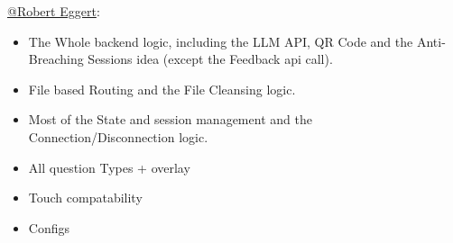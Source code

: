 \href{https://github.com/RobertEggert}{@Robert Eggert}: 
\begin{itemize}
    \item The Whole backend logic, including the LLM API, QR Code and the Anti-Breaching Sessions idea (except the Feedback api call).
    \item File based Routing and the File Cleansing logic.
    \item Most of the State and session management and the Connection/Disconnection logic.
    \item All question Types + overlay
    \item Touch compatability
    \item Configs
\end{itemize}
